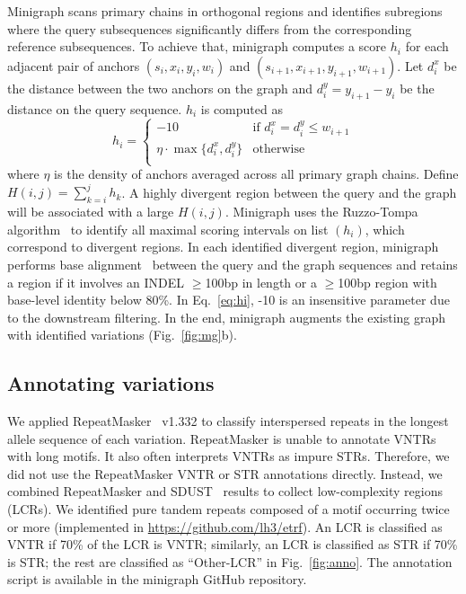 \documentclass[twocolumn]{bmcart}%
\begin{document}
Minigraph scans primary chains in orthogonal regions and identifies subregions
where the query subsequences significantly differs from the corresponding
reference subsequences. To achieve that, minigraph computes a score $h_i$ for
each adjacent pair of anchors $(s_i,x_i,y_i,w_i)$ and
$(s_{i+1},x_{i+1},y_{i+1},w_{i+1})$. Let $d^x_i$ be the distance between the
two anchors on the graph and $d^y_i=y_{i+1}-y_i$ be the distance on the query
sequence. $h_i$ is computed as
\begin{equation}\label{eq:hi}
h_i=\left\{\begin{array}{ll}
-10 & \mbox{if $d^x_i=d^y_i\le w_{i+1}$} \\
\eta\cdot\max\{d^x_i,d^y_i\} & \mbox{otherwise}\\
\end{array}\right.
\end{equation}
where $\eta$ is the density of anchors averaged across all primary graph
chains. Define $H(i,j)=\sum_{k=i}^j h_k$. A highly divergent region between the
query and the graph will be associated with a large $H(i,j)$. Minigraph uses
the Ruzzo-Tompa algorithm~\cite{DBLP:conf/ismb/RuzzoT99} to identify all
maximal scoring intervals on list $(h_i)$, which correspond to divergent
regions. In each identified divergent region, minigraph performs base
alignment~\cite{Suzuki:2018aa,Li:2018ab} between the query and the graph
sequences and retains a region if it involves an INDEL $\ge$100bp in length or
a $\ge$100bp region with base-level identity below 80\%. In Eq.~\ref{eq:hi},
-10 is an insensitive parameter due to the downstream filtering. In the end,
minigraph augments the existing graph with identified variations
(Fig.~\ref{fig:mg}b).

\subsection*{Annotating variations}

We applied RepeatMasker~\cite{Tarailo-Graovac:2009aa} v1.332 to classify
interspersed repeats in the longest allele sequence of each variation.
RepeatMasker is unable to annotate VNTRs with long motifs. It also often
interprets VNTRs as impure STRs. Therefore, we did not use the RepeatMasker
VNTR or STR annotations directly. Instead, we combined RepeatMasker and
SDUST~\cite{Morgulis:2006aa} results to collect low-complexity regions (LCRs).
We identified pure tandem repeats composed of a motif occurring twice or more
(implemented in
\href{https://github.com/lh3/etrf}{https://github.com/lh3/etrf}). An LCR is
classified as VNTR if 70\% of the LCR is VNTR; similarly, an LCR is classified
as STR if 70\% is STR; the rest are classified as ``Other-LCR'' in
Fig.~\ref{fig:anno}. The annotation script is available in the minigraph GitHub
repository.
\end{document}
